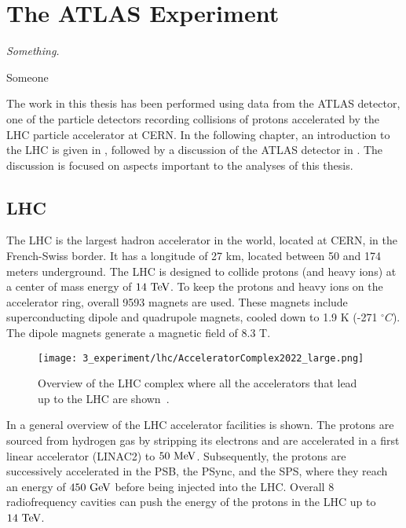 \chapter{The ATLAS Experiment}
\label{ch:atlas}

\epigraph{\emph{Something.}}{Someone}

The work in this thesis has been performed using data from the \ac{ATLAS} detector, one of the particle detectors recording collisions of protons accelerated by the \ac{LHC} particle accelerator at \ac{CERN}. 
In the following chapter, an introduction to the \ac{LHC} is given in \Sect{\ref{sec:atlas:LHC}}, followed by a discussion of the \ac{ATLAS} detector in \Sect{\ref{sec:atlas:atlas}}. The discussion is focused on aspects important to the analyses of this thesis.






\section{LHC}
\label{sec:atlas:LHC}

The \ac{LHC} \cite{LHC-TDR,LHC-Machine} is the largest hadron accelerator in the world, located at \ac{CERN}, in the French-Swiss border. It has a longitude of 27 km, located between 50 and 174 meters underground.
The \ac{LHC} is designed to collide protons (and heavy ions) at a center of mass energy of \(14~\text{TeV}\). To keep the protons and heavy ions on the accelerator ring, overall 9593 magnets are used. These magnets include superconducting dipole and quadrupole magnets, cooled down to 1.9 K (-271 $^{\circ} C$). The dipole magnets generate a magnetic field of 8.3 T.

\begin{figure}[ht!]
    \centering
    \texttt{[image: 3\_experiment/lhc/AcceleratorComplex2022\_large.png]}
    \caption{Overview of the \ac{LHC} complex where all the accelerators that lead up to the \ac{LHC} are shown~\cite{LHC-complex}.}
    \label{fig:atlas:lhc:lhc}
\end{figure}

In \Fig{\ref{fig:atlas:lhc:lhc}} a general overview of the \ac{LHC} accelerator facilities is shown. The protons are sourced from hydrogen gas by stripping its electrons and are accelerated in a first linear accelerator (LINAC2) to \(50~\text{MeV}\). Subsequently, the protons are successively accelerated in the \ac{PSB}, the \ac{PSync}, and the \ac{SPS}, where they reach an energy of \(450~\text{GeV}\) before being injected into the \ac{LHC}.  Overall 8 radiofrequency cavities can push the energy of the protons in the \ac{LHC} up to \(14~\text{TeV}\).

